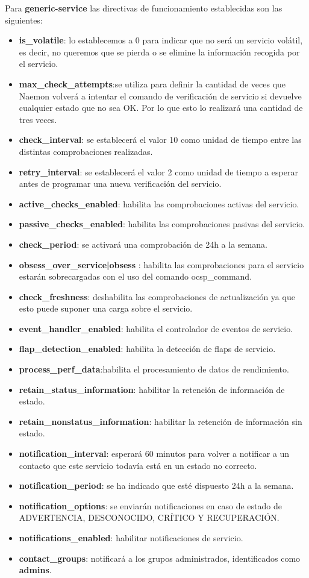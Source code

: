 Para \textbf{generic-service} las directivas de funcionamiento establecidas son las siguientes:
\begin{itemize}
	
	\item \textbf{is\_volatile}: lo establecemos a 0 para indicar que no será un servicio volátil, es decir, no queremos que se pierda o se elimine la información recogida por el servicio.
	\item \textbf{max\_check\_attempts}:se utiliza para definir la cantidad de veces que Naemon volverá a intentar el comando de verificación de servicio si devuelve cualquier estado que no sea OK. 	Por lo que esto lo realizará una cantidad de tres veces.
	\item \textbf{check\_interval}: se establecerá el valor 10 como unidad de tiempo entre las distintas comprobaciones realizadas.
	\item \textbf{retry\_interval}: se establecerá el valor 2 como unidad de tiempo a esperar antes de programar una nueva verificación del servicio.
	\newpage
	\item \textbf{active\_checks\_enabled}: habilita las comprobaciones activas del servicio.
	\item \textbf{passive\_checks\_enabled}: habilita las comprobaciones pasivas del servicio.
	\item \textbf{check\_period}: se activará una comprobación de 24h a la semana.	
	\item \textbf{obsess\_over\_service|obsess}	: habilita las comprobaciones para el servicio estarán sobrecargadas con el uso del comando ocsp\_command. 
	\item \textbf{check\_freshness}: deshabilita las comprobaciones de actualización ya que esto puede suponer una carga sobre el servicio. 	
	\item \textbf{event\_handler\_enabled}: habilita el controlador de eventos de servicio.
	\item \textbf{flap\_detection\_enabled}: habilita la detección de flaps de servicio.
	\item \textbf{process\_perf\_data}:habilita el procesamiento de datos de rendimiento.
	\item \textbf{retain\_status\_information}: habilitar la retención de información de estado.
	\item \textbf{retain\_nonstatus\_information}: habilitar la retención de información sin estado.
	\item \textbf{notification\_interval}: esperará 60 minutos para volver a notificar a un contacto que este servicio todavía está en un estado no correcto.	

	\item \textbf{notification\_period}: se ha indicado que esté dispuesto 24h a la semana.
	\item \textbf{notification\_options}: se enviarán notificaciones en caso de estado de ADVERTENCIA, DESCONOCIDO, CRÍTICO Y RECUPERACIÓN. 
	\item \textbf{notifications\_enabled}: habilitar notificaciones de servicio. 
	\item \textbf{contact\_groups}: notificará a los grupos administrados, identificados como \textbf{admins}.
	
\end{itemize}
